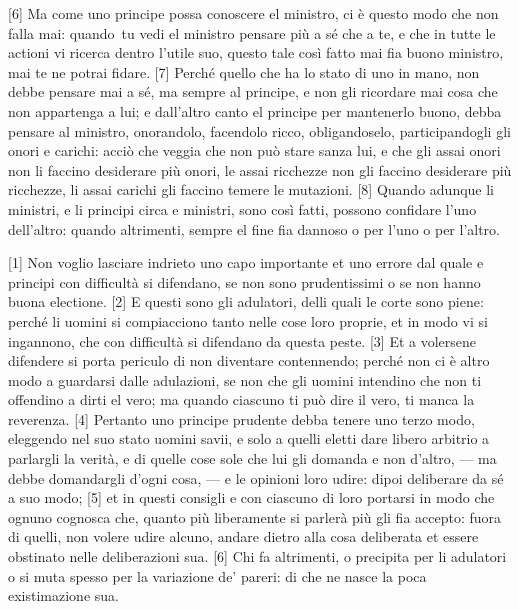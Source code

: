 {[}6{]} Ma come uno principe possa conoscere el ministro, ci è questo
modo che non falla mai: quando\est\ tu vedi el ministro pensare più a sé che
a te, e che in tutte le actioni vi ricerca dentro l'utile suo, questo
tale così fatto mai fia buono ministro, mai te ne potrai fidare. {[}7{]}
Perché quello che ha lo stato di uno in mano, non debbe pensare mai a
sé, ma sempre al principe, e non gli ricordare mai cosa che non
appartenga a lui; e dall'altro canto el principe per mantenerlo buono,
debba pensare al ministro, onorandolo, facendolo ricco, obligandoselo,
participandogli gli onori e carichi: acciò che veggia che non può stare
sanza lui, e che gli assai onori non li faccino desiderare più onori, le
assai ricchezze non gli faccino desiderare più ricchezze, li assai
carichi gli faccino temere le mutazioni. {[}8{]} Quando adunque li
ministri, e li principi circa e ministri, sono così fatti, possono
confidare l'uno dell'altro: quando altrimenti, sempre el fine fia
dannoso o per l'uno o per l'altro.


{[}1{]} Non voglio lasciare indrieto uno capo importante et uno errore
dal quale e principi con difficultà si difendano, se non sono
prudentissimi o se non hanno buona electione. {[}2{]} E questi sono gli
adulatori, delli quali le corte sono piene: perché li uomini si
compiacciono tanto nelle cose loro proprie, et in modo vi si ingannono,
che con difficultà si difendano da questa peste. {[}3{]} Et a volersene
difendere si porta periculo di non diventare contennendo; perché non ci
è altro modo a guardarsi dalle adulazioni, se non che gli uomini
intendino che non ti offendino a dirti el vero; ma quando ciascuno ti
può dire il vero, ti manca la reverenza. {[}4{]} Pertanto uno principe
prudente debba tenere uno terzo modo, eleggendo nel suo stato uomini
savii, e solo a quelli eletti dare libero arbitrio a parlargli la
verità, e di quelle cose sole che lui gli domanda e non d'altro, --- ma
debbe domandargli d'ogni cosa, --- e le opinioni loro udire: dipoi
deliberare da sé a suo modo; {[}5{]} et in questi consigli e con
ciascuno di loro portarsi in modo che ognuno cognosca che, quanto più
liberamente si parlerà più gli fia accepto: fuora di quelli, non volere
udire alcuno, andare dietro alla cosa deliberata et essere obstinato
nelle deliberazioni sua. {[}6{]} Chi fa altrimenti, o precipita per li
adulatori o si muta spesso per la variazione de' pareri: di che ne nasce
la poca existimazione sua.

